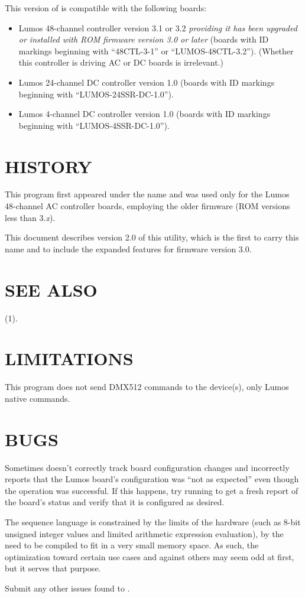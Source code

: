 This version of 
is compatible with the following boards:
\begin{itemize}
\item
Lumos 48-channel controller version 3.1 or 3.2
\emph{providing it has been upgraded or installed with ROM firmware version 3.0 or later}
(boards with ID markings beginning with ``48CTL-3-1'' or ``LUMOS-48CTL-3.2'').  (Whether this controller is
driving AC or DC boards is irrelevant.)
\item
Lumos 24-channel DC controller version 1.0 (boards with ID markings beginning with
``LUMOS-24SSR-DC-1.0'').
\item
Lumos 4-channel DC controller version 1.0 (boards with ID markings beginning with
``LUMOS-4SSR-DC-1.0'').
\end{itemize}
\section*{HISTORY}



This program first appeared under the name
and was used only for the Lumos 48-channel AC controller boards, employing the
older firmware (ROM versions less than
3.\emph{x}).


This document describes version 2.0 of this utility, which is the first to carry
this name and to include the expanded features for firmware version 3.0.
\section*{SEE ALSO}
(1).
\section*{LIMITATIONS}


This program does not send DMX512 commands to the device(s), only Lumos native
commands.
\section*{BUGS}


Sometimes 
doesn't correctly track board configuration changes and incorrectly reports that 
the Lumos board's configuration was ``not as expected'' even though the operation
was successful.  If this happens, try running
to get a fresh report of the board's status and verify that it is configured as desired.


The sequence language is constrained by the limits of the hardware (such as 8-bit
unsigned integer values and limited arithmetic expression evaluation), 
by the need to 
be compiled to fit in a very small memory space.  As such, the optimization
toward certain use cases and against others may seem odd at first, but it serves that
purpose.


Submit any other issues found to 
.
